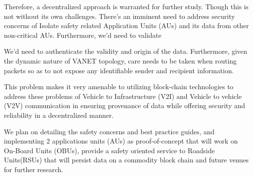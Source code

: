 Therefore, a decentralized approach is warranted for further study. Though this
is not without its own challenges. There's an imminent need to address security
concerns of  Isolate safety related Application Units (AUs) and its data from other non-critical AUs. Furthermore, we'd need to validate 

We'd need to authenticate the validity and origin of the data.
Furthermore, given the dynamic nature of VANET topology, care needs to be taken
when routing packets so as to not expose any identifiable sender and recipient
information.

This problem makes it very amenable to utilizing block-chain technologies to
address these problems of Vehicle to Infrastructure (V2I) and Vehicle to vehicle
(V2V) communication in ensuring provenance of data while offering security and
reliability in a decentralized manner.\cite{blockchain2019}

We plan on detailing the safety concerns and best practice guides, and implementing 2 applications units (AUs) as proof-of-concept that will work on On-Board Units (OBUs), provide a safety oriented service to Roadside Units(RSUs) that will persist data on a commodity block chain and future venues for further research.
\cite{leiding2016self}\cite{jiang2018blockchain}
